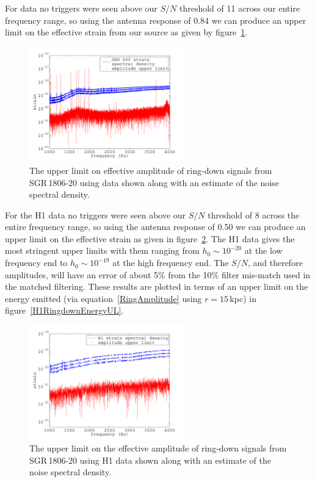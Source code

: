 For \geo data no triggers were seen above our $S/N$ threshold of 11 across our entire frequency
range, so using the antenna response of 0.84 we can produce an upper limit on the effective strain
from our source as given by figure~\ref{GEORingdownUL}.
\begin{figure}[!htbp]
\begin{center}
\includegraphics[width=0.6\textwidth]{figs/GEORingdownUL}\caption[The upper limit on
effective amplitude of ring-down signals from SGR\,1806-20 using \geo data.]{The upper limit on
effective amplitude of ring-down signals from SGR\,1806-20 using \geo data shown along with an
estimate of the noise spectral density.}\label{GEORingdownUL}
\end{center}
\end{figure}
For the H1 data no triggers were seen above our $S/N$ threshold of 8 across the entire frequency
range, so using the antenna response of 0.50 we can produce an upper limit on the effective strain
as given in figure~\ref{H1RingdownUL}. The H1 data gives the most stringent upper limits with them
ranging from $h_0 \sim 10^{-20}$ at the low frequency end to $h_0 \sim 10^{-19}$ at the high
frequency end. The $S/N$, and therefore amplitudes, will have an error of about 5\% from the 10\%
filter mis-match used in the matched filtering. These results are plotted in terms of an upper
limit on the energy emitted (via equation~\ref{RingAmplitude} using $r = 15$\,kpc) in
figure~\ref{H1RingdownEnergyUL}.
\begin{figure}[!htbp]
\begin{center}
\includegraphics[width=0.6\textwidth]{figs/H1RingdownUL}\caption[The upper limit on the effective
amplitude of ring-down signals from SGR\,1806-20 using H1 data.]{The upper limit on the effective
amplitude of ring-down signals from SGR\,1806-20 using H1 data shown along with an estimate of the
noise spectral density.}\label{H1RingdownUL}
\end{center}
\end{figure}
